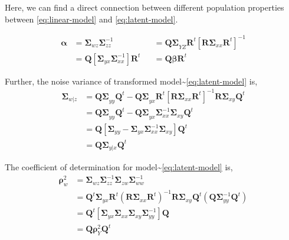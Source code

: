 \documentclass[12pt,A4paper,authoryear]{elsarticle} %
\providecommand{\tightlist}{%
  \setlength{\itemsep}{0pt}\setlength{\parskip}{0pt}}
\theoremstyle{definition}
\theoremstyle{definition}
\theoremstyle{remark}
\begin{document}
Here, we can find a direct connection between different population
properties between \eqref{eq:linear-model} and \eqref{eq:latent-model}.

\begin{description}
\tightlist
\item[Regression Coefficients]
\[
  \begin{aligned}
  \boldsymbol{\alpha} &= \boldsymbol{\Sigma}_{wz} \boldsymbol{\Sigma}_{zz}^{-1}
  &&= \boldsymbol{Q\Sigma}_{YZ}\mathbf{R}^t\left[\boldsymbol{R\Sigma}_{xx}\mathbf{R}^t\right]^{-1} \\
  &= \mathbf{Q}\left[\boldsymbol{\Sigma}_{yx}\boldsymbol{\Sigma}_{xx}^{-1}\right]\mathbf{R}^t
  &&= \mathbf{Q}\boldsymbol{\beta}\mathbf{R}^t
  \end{aligned}
  \]
\item[Error Variance]
Further, the noise variance of transformed
model\textasciitilde{}\eqref{eq:latent-model} is, \[
  \begin{aligned}
\boldsymbol{\Sigma}_{w|z}
&= \boldsymbol{Q\Sigma}_{yy}\mathbf{Q}^t -
  \boldsymbol{Q \Sigma}_{yx}\mathbf{R}^t \left[\boldsymbol{R\Sigma}_{xx}\boldsymbol{R}^t\right]^{-1}
  \boldsymbol{R\Sigma}_{xy}\mathbf{Q}^t \nonumber \\
&= \boldsymbol{Q\Sigma}_{yy}\mathbf{Q}^t - 
  \boldsymbol{Q \Sigma}_{yx}\boldsymbol{\Sigma}_{xx}^{-1}\boldsymbol{\Sigma}_{xy}\mathbf{Q}^t \nonumber \\
&= \mathbf{Q}\left[\boldsymbol{\Sigma}_{yy} -
  \boldsymbol{\Sigma}_{yx}\boldsymbol{\Sigma}_{xx}^{-1}\boldsymbol{\Sigma}_{xy}\right]\mathbf{Q}^{t} \nonumber \\
&= \mathbf{Q} \boldsymbol{\Sigma}_{y|x}\mathbf{Q}^t
  \end{aligned}
  \]
\item[Coefficient of Determination]
The coefficient of determination for
model\textasciitilde{}\eqref{eq:latent-model} is, \[
  \begin{aligned}
\boldsymbol{\rho}^2_w &= \boldsymbol{\Sigma}_{wz} 
\boldsymbol{\Sigma}_{zz}^{-1} \boldsymbol{\Sigma}_{zw} 
\boldsymbol{\Sigma}_{ww}^{-1} \\
  &=\mathbf{Q}^t
  \boldsymbol{\Sigma}_{yx}\mathbf{R}^t \left(\mathbf{R}\boldsymbol{\Sigma}_{xx}\mathbf{R}^t\right)^{-1}
  \mathbf{R}\boldsymbol{\Sigma}_{xy}\mathbf{Q}^t \left(\mathbf{Q} \boldsymbol{\Sigma}_{yy}^{-1} \mathbf{Q}^t\right) \nonumber \\
  &=\mathbf{Q}^t\left[\boldsymbol{\Sigma}_{yx}\boldsymbol{\Sigma}_{xx}\boldsymbol{\Sigma}_{xy}\boldsymbol{\Sigma}_{yy}^{-1}\right]\mathbf{Q} \\
  &= \mathbf{Q}\boldsymbol{\rho}_{Y}^2 \mathbf{Q}^t
  \end{aligned}
  \]
\end{description}
\end{document}
